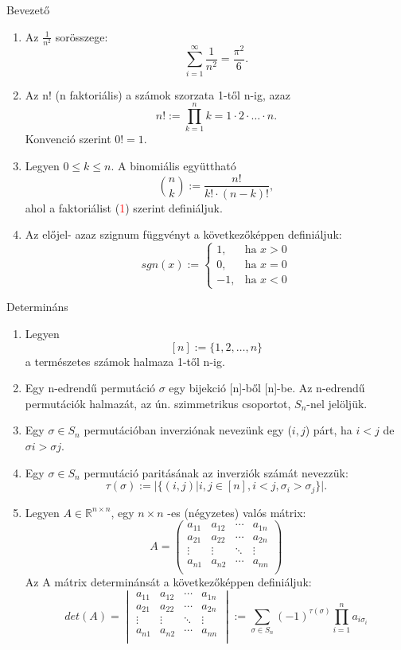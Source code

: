 \documentclass{article}
\begin{document}
Bevezető
\begin{enumerate}[label=\alph*)]
\item\noindent Az $\frac{1}{n^2} $ sorösszege: \[\sum_{i=1}^\infty \frac{1}{n^2}  = \frac{\pi^2}{6}.\] 
\item Az n! (n faktoriális) a számok szorzata 1-től n-ig, azaz  \[n! := \prod_{k=1}^n k = 1 \cdot 2 \cdot \ldots \cdot n. \] 
Konvenció szerint $0! = 1.$\\
\item Legyen  $0 \leq k \leq n.$ A binomiális együttható \[\binom{n}{k} := \frac{n!}{k! \cdot (n - k)!},\] ahol a faktoriálist (\textcolor{red}{1}) szerint definiáljuk.
\item Az előjel- azaz szignum függvényt a következőképpen definiáljuk: \[sgn(x) := \begin{cases} 1, &  \text{ha } x > 0\\ 0, &  \text{ha } x = 0\\- 1, &  \text{ha } x < 0  \end{cases}\]
\end{enumerate}

Determináns
\begin{enumerate}[label=\alph*)]
\item Legyen \[ [n] := \{1, 2, \ldots , n\} \] a természetes számok halmaza 1-től n-ig.
\item Egy n-edrendű permutáció $\sigma$ egy bijekció [n]-ből [n]-be. Az n-edrendű permutációk halmazát, az ún. szimmetrikus csoportot, $S_{n}$-nel jelöljük.
\item  Egy $\sigma \in S_{n}$ permutációban inverziónak nevezünk egy ($i, j$) párt, ha $i < j$ de $\sigma i > \sigma j$.
\item Egy $\sigma \in S_{n}$ permutáció paritásának az inverziók számát nevezzük: \[\tau(\sigma) := \vert \{ (i,j)  \vert  i,j \in [n], i<j, \sigma_{i} > \sigma_{j} \} \vert. \]
\item Legyen $A \in \mathbb{R}^{n \times n}$, egy $n \times n$ -es (négyzetes) valós mátrix: 
\[ A = \left(
\begin{matrix} 
a_{11}  & a_{12} & \cdots & a_{1n} \\
a_{21} & a_{22} & \cdots & a_{2n} \\
\vdots & \vdots & \ddots & \vdots \\
a_{n1} & a_{n2} & \cdots & a_{nn}\\
\end{matrix}
\right) \]
\newpage
Az A mátrix determinánsát a következőképpen definiáljuk:
\[ det(A) =
\begin{vmatrix*} 
a_{11}  & a_{12} & \cdots & a_{1n} \\
a_{21} & a_{22} & \cdots & a_{2n} \\
\vdots & \vdots & \ddots & \vdots \\
a_{n1} & a_{n2} & \cdots & a_{nn}\\
\end{vmatrix*} := \sum_{\sigma \in S_{n}} (-1)^{\tau (\sigma)} \prod_{i=1}^{n} a_{i \sigma_{i}}\]
\end{enumerate}
\end{document}
